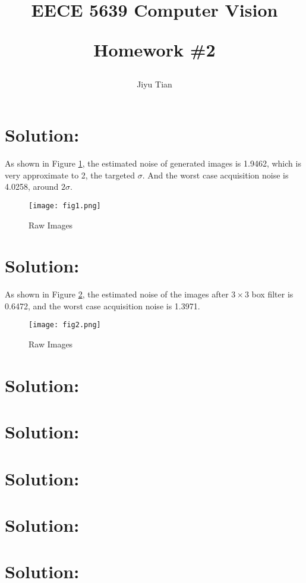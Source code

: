 \documentclass[12pt]{article}
\title{EECE 5639 Computer Vision\\ [2ex] \begin{large} Homework \#2 \end{large} }
\author{Jiyu Tian}
\date{}
\begin{document}
\maketitle
\section{Solution:}
As shown in Figure \ref{raw}, the estimated noise of generated images is 1.9462, which is very approximate to 2, the targeted $\sigma$. And the worst case acquisition noise is 4.0258, around $2\sigma$.
\begin{figure}[H]
\centering
\texttt{[image: fig1.png]}
\caption{Raw Images}
\label{raw}
\end{figure}
\section{Solution:}
As shown in Figure \ref{filtered}, the estimated noise of the images after $3\times3$ box filter is 0.6472, and the worst case acquisition noise is 1.3971.
\begin{figure}[H]
\centering
\texttt{[image: fig2.png]}
\caption{Raw Images}
\label{filtered}
\end{figure}
\section{Solution:}

\section{Solution:}

\section{Solution:}

\section{Solution:}

\section{Solution:}
\end{document}

